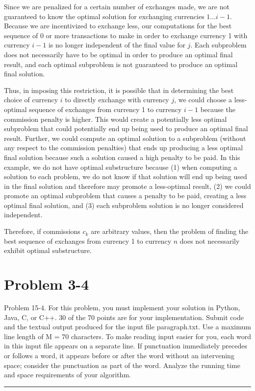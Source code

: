 \documentclass[11pt]{article}
\def\separateline{\medskip\hrule\medskip}
\begin{document}
Since we are penalized for a certain number of exchanges made, we are not guaranteed to know the optimal solution for exchanging currencies $1...i-1$. Because we are incentivized to exchange less, our computations for the best sequence of 0 or more transactions to make in order to exchange currency 1 with currency $i-1$ is no longer independent of the final value for $j$. Each subproblem does not necessarily have to be optimal in order to produce an optimal final result, and each optimal subproblem is not guaranteed to produce an optimal final solution.

Thus, in imposing this restriction, it is possible that in determining the best choice of currency $i$ to directly exchange with currency $j$, we could choose a less-optimal sequence of exchanges from currency 1 to currency $i-1$ because the commission penalty is higher. This would create a potentially less optimal subproblem that could potentially end up being used to produce an optimal final result. Further, we could compute an optimal solution to a subproblem (without any respect to the commission penalties) that ends up producing a less optimal final solution because such a solution caused a high penalty to be paid. In this example, we do not have optimal substructure because (1) when computing a solution to each problem, we do not know if that solution will end up being used in the final solution and therefore may promote a less-optimal result, (2) we could promote an optimal subproblem that causes a penalty to be paid, creating a less optimal final solution, and (3) each subproblem solution is no longer considered independent.

Therefore, if commissions $c_k$ are arbitrary values, then the problem of finding the best sequence of exchanges from currency 1 to currency $n$ does not necessarily exhibit optimal substructure.

\newpage

\section{Problem 3-4}
Problem 15-4. For this problem, you must implement your solution in Python, Java, C, or C++. 30 of the 70 points are for your implementation. Submit code and the textual output produced for the input file paragraph.txt. Use a maximum line length of M = 70 characters. To make reading input easier for you, each word in this input file appears on a separate line. If punctuation immediately precedes or follows a word, it appears before or after the word without an intervening space; consider the punctuation as part of the word. Analyze the running time and space requirements of your algorithm.
\separateline
\end{document}
